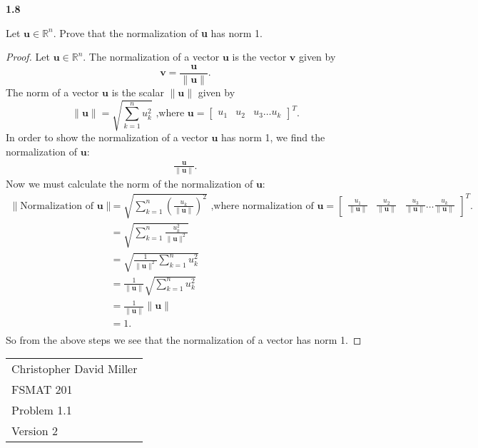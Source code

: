 \documentclass[12pt]{article}
\begin{document}
\textbf{1.8} \\  %
\begin{prop}
Let $\mathbf{u} \in \mathbb{R}^n$. Prove that the normalization of \textbf{u} has norm 1.
\end{prop}
\begin{proof}
    Let $\mathbf{u} \in \mathbb{R}^n$.
    The normalization of a vector $\mathbf{u}$ is the vector $\mathbf{v}$ given by   
    \[\mathbf{v} = \frac{\mathbf{u}}{\| \mathbf{u} \|}.\] 
    The norm of a vector $\mathbf{u}$ is the scalar $\|  \mathbf{u} \|$ given by   
    $$\|  \mathbf{u} \| = \sqrt{\sum_{k=1}^{n}u_k^2} \text{ ,where } \mathbf{u} = \begin{bmatrix}u_1  &u_2& u_3 \dots u_k
       \end{bmatrix}^{T}.  $$ 
    In order to show the normalization of a vector $\mathbf{u}$ has norm 1, we find the normalization of $\mathbf{u}$:
       \begin{align*}
         \frac{\mathbf{u}}{\| \mathbf{u} \|}.
       \end{align*}
       Now we must calculate the norm of the normalization of $\mathbf{u}$:
        \begin{align*}
          \|  \text{Normalization of }\mathbf{u} \| &=  \sqrt{\sum_{k=1}^{n}\left(\frac{u_k}{\| \mathbf{u} \|}\right)^2} \text{ ,where normalization of  } \mathbf{u} = \begin{bmatrix}\frac{u_1}{\| \mathbf{u} \|}  &\frac{u_2}{\| \mathbf{u} \|}& \frac{u_3}{\| \mathbf{u} \|} \dots \frac{u_k}{\| \mathbf{u} \|}
          \end{bmatrix}^{T}.\\ 
                            &=  \sqrt{\sum_{k=1}^{n}\frac{u_k^2}{\| \mathbf{u} \|^2}} \\ 
                            &=  \sqrt{\frac{1}{\| \mathbf{u} \|^2}\sum_{k=1}^{n} u_k^2} \\
                            &=  \frac{1}{\| \mathbf{u} \|}\sqrt{\sum_{k=1}^{n} u_k^2} \\
                            &=  \frac{1}{\| \mathbf{u} \|} \| \mathbf{u} \| \\
                            &=  1. \\
        \end{align*}
        So from the above steps we see that the normalization of a vector has norm 1.  
\end{proof}
\newpage
\begin{flushright}
    \begin{tabular}{l}
    Christopher David Miller \\  %
    FSMAT 201 \\  %
    Problem 1.1 \\  %
    Version 2 \\ %
    \end{tabular}
    \end{flushright}
\end{document}
